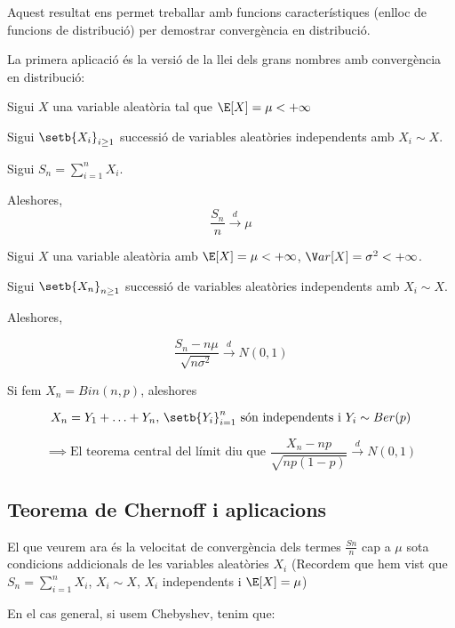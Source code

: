 Aquest resultat ens permet treballar amb funcions característiques (enlloc de funcions de distribució) per
demostrar convergència en distribució.

La primera aplicació és la versió de la llei dels grans nombres amb convergència en distribució:

\begin{thm}
  Sigui $X$ una variable aleatòria tal que $\E[X] = \mu < +\infty$
  
  Sigui $\setb{X_i}_{i\geq1}$ successió de variables aleatòries independents amb $X_i \sim X$.
  
  Sigui $S_n = \sum\limits_{i=1}^n X_i$.
  
  Aleshores,
  \[
    \frac{S_n}{n} \overset{d}{\to} \mu
  \]
\end{thm}

\begin{thm}
  Sigui $X$ una variable aleatòria amb $\E[X] = \mu < +\infty$, $\V ar[X] = \sigma^2 < +\infty$.
  
  Sigui $\setb{X_n}_{n\geq1}$ successió de variables aleatòries independents amb $X_i \sim X$.
  
  Aleshores, 
  
  \[
    \frac{S_n -n\mu}{\sqrt{n\sigma^2}} \overset{d}{\to} N(0,1)
  \]
\end{thm}

\begin{example}
  Si fem $X_n = Bin(n,p)$, aleshores
  
  $$X_n = Y_1 + \ldots + Y_n, \, \setb{Y_i}_{i=1}^n \text{ són independents i } Y_i \sim Ber(p)$$
  
  $$\implies \text{El teorema central del límit diu que } \frac{X_n - np}{\sqrt{np(1-p)}} \overset{d}{\to} N(0,1)$$
\end{example}

\subsection{Teorema de Chernoff i aplicacions}

El que veurem ara és la velocitat de convergència dels termes $\frac{Sn}{n}$ cap a $\mu$ sota condicions addicionals de les variables aleatòries $X_i$ (Recordem que hem vist que $S_n = \sum\limits_{i=1}^n X_i$, $X_i\sim X$, $X_i$ independents i $\E[X] = \mu$)

En el cas general, si usem Chebyshev, tenim que:

